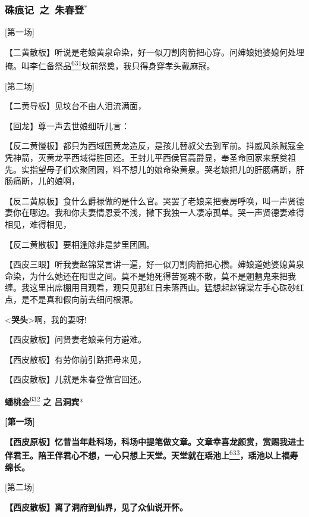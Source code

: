 \newpage
{}
\subsubsection{{\hei\large 硃痕记~{\normalsize 之}~朱春登}$^\ast$}%

{[}第一场{]}

【二黄散板】听说是老娘黄泉命染，好一似刀割肉箭把心穿。问婶娘她婆媳何处埋掩。叫李仁备祭品\protect\hyperlink{fn631}{\textsuperscript{631}}坟前祭奠，我只得身穿孝头戴麻冠。

{[}第二场{]}

【二黄导板】见坟台不由人泪流满面，

【回龙】尊一声去世娘细听儿言：

【反二黄慢板】都只为西域国黄龙造反，是孩儿替叔父去到军前。抖威风杀贼寇全凭神箭，灭黄龙平西域得胜回还。王封儿平西侯官高爵显，奉圣命回家来祭奠祖先。实指望母子们欢聚团圆，料不想儿的娘命染黄泉。哭老娘把儿的肝肠痛断，肝肠痛断，儿的娘啊，

【反二黄原板】食什么爵禄做的是什么官。哭罢了老娘亲把妻房呼唤，叫一声贤德妻你在哪边。我和你夫妻情恩爱不浅，撇下我独一人凄凉孤单。哭一声贤德妻难得相见，难得相见，

【反二黄散板】要相逢除非是梦里团圆。

【西皮三眼】听我妻赵锦棠言讲一遍，好一似刀割肉箭把心攒。婶娘道她婆媳黄泉命染，为什么她还在阳世之间。莫不是她死得苦冤魂不散，莫不是魍魉鬼来把我缠。我这里出席棚用目观看，观只见那红日未落西山。猛想起赵锦棠左手心硃砂红点，是不是真和假向前去细问根源。

\textless{}\textbf{哭头}\textgreater{}啊，我的妻呀!

【西皮散板】问贤妻老娘亲何方避难。

【西皮散板】有劳你前引路把母来见，

【西皮散板】儿就是朱春登做官回还。

\newpage
\textbf{蟠桃会}\protect\hyperlink{fn632}{\textsuperscript{632}}
\textbf{之 吕洞宾}*

\textbf{{[}第一场{]}}

\textbf{【西皮原板】忆昔当年赴科场，科场中提笔做文章。文章幸喜龙颜赏，赏赐我进士伴君王。陪王伴君心不想，一心只想上天堂。天堂就在瑶池上}\protect\hyperlink{fn633}{\textsuperscript{633}}\textbf{，瑶池以上福寿绵长。}

{[}第二场{]}

\textbf{【西皮散板】离了洞府到仙界，见了众仙说开怀。}

